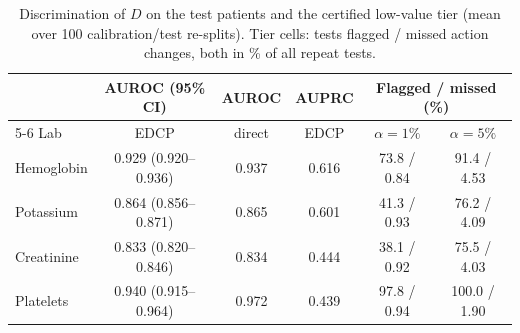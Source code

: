 \begin{table}[t]\centering\scriptsize
\caption{Discrimination of $D$ on the test patients and the certified low-value tier (mean over 100 calibration/test re-splits). Tier cells: tests flagged / missed action changes, both in \% of all repeat tests.}
\label{tab:perf}\setlength{\tabcolsep}{2.5pt}
\begin{tabular}{lcccc c}\toprule
 & AUROC (95\% CI) & AUROC & AUPRC & \multicolumn{2}{c}{Flagged / missed (\%)} \\ \cmidrule(lr){5-6}
Lab & EDCP & direct & EDCP & $\alpha{=}1\%$ & $\alpha{=}5\%$ \\ \midrule
Hemoglobin & 0.929 (0.920--0.936) & 0.937 & 0.616 & 73.8 / 0.84 & 91.4 / 4.53 \\
Potassium & 0.864 (0.856--0.871) & 0.865 & 0.601 & 41.3 / 0.93 & 76.2 / 4.09 \\
Creatinine & 0.833 (0.820--0.846) & 0.834 & 0.444 & 38.1 / 0.92 & 75.5 / 4.03 \\
Platelets & 0.940 (0.915--0.964) & 0.972 & 0.439 & 97.8 / 0.94 & 100.0 / 1.90 \\
\bottomrule\end{tabular}\end{table}
